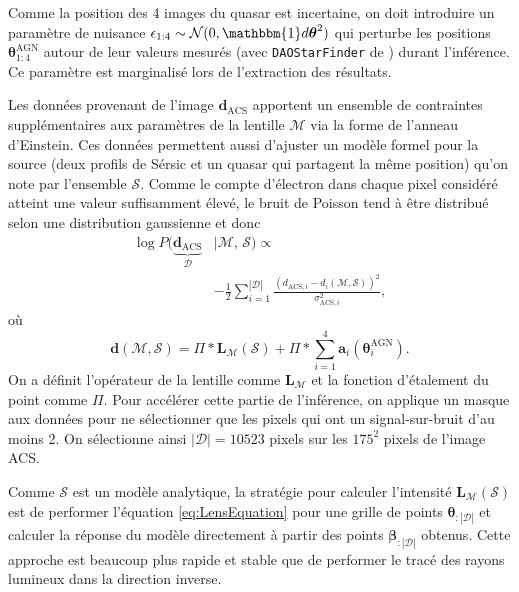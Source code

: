 \documentclass[times,10pt,twocolumn]{article}
\begin{document}
Comme la position des 4 images du quasar est incertaine, on doit introduire un 
paramètre de nuisance $\epsilon_{1:4} \sim \mathcal{N}(0, \mathbbm{1} d \boldsymbol{\theta}^2)$ 
qui perturbe les positions $\boldsymbol{\theta}^{\mathrm{AGN}}_{1:4}$ 
autour de leur valeurs mesurés (avec \texttt{DAOStarFinder} de \citet{Stetson1987}) 
durant l'inférence. Ce paramètre est marginalisé lors de l'extraction des résultats.

Les données provenant de l'image $\mathbf{d}_{\mathrm{ACS}}$ apportent 
un ensemble de contraintes supplémentaires aux paramètres de la lentille $\mathcal{M}$ 
via la forme de l'anneau d'Einstein. Ces données permettent aussi d'ajuster 
un modèle 
formel pour la source (deux profils de Sérsic et un quasar qui partagent 
la même position) qu'on note par l'ensemble 
$\mathcal{S}$. Comme le compte d'électron dans chaque pixel considéré atteint 
une valeur suffisamment élevé, le bruit de Poisson tend à être distribué selon 
une distribution 
gaussienne et donc 
\begin{align}
        \nonumber
        \log P(\underbrace{\mathbf{d}_{\mathrm{ACS}}}_{\mathcal{D}}
        &| \mathcal{M},\, \mathcal{S}) \propto  \\
\label{eq:ImageLike}
        &-\frac{1}{2}\sum_{i=1}^{|\mathcal{D}|} \frac{(d_{\mathrm{ACS},i} - 
        d_i(\mathcal{M}, \mathcal{S}))^{2}}
        {\sigma_{\mathrm{ACS},i}^2},
\end{align} 
où 
\begin{equation}\label{eq:d_i} 
        \mathbf{d}(\mathcal{M}, \mathcal{S}) = 
        \Pi * \mathbf{L}_{\mathcal{M}}(\mathcal{S}) + 
        \Pi * \sum_{i=1}^{4}\mathbf{a}_i(\boldsymbol{\theta}_i^{\mathrm{AGN}}).
\end{equation} 
On a définit l'opérateur de la lentille comme $\mathbf{L}_{\mathcal{M}}$ et 
la fonction d'étalement du point comme $\Pi$. 
Pour accélérer cette partie de l'inférence, on applique un masque aux données 
pour ne sélectionner que les pixels qui ont un signal-sur-bruit d'au moins 2. On sélectionne 
ainsi $|\mathcal{D}| = 10523$ pixels sur les $175^2$ pixels de l'image ACS. 

Comme $\mathcal{S}$ est un modèle analytique, la stratégie pour calculer l'intensité 
$\mathbf{L}_{\mathcal{M}}(\mathcal{S})$ 
est de performer l'équation \eqref{eq:LensEquation} 
pour une grille de points $\boldsymbol{\theta}_{:|\mathcal{D}|}$ 
et calculer la réponse du modèle 
directement à partir des points $\boldsymbol{\beta}_{:|\mathcal{D}|}$ obtenus. 
Cette approche est 
beaucoup plus rapide et stable 
que de performer le tracé des rayons lumineux dans 
la direction inverse. 
\end{document}
